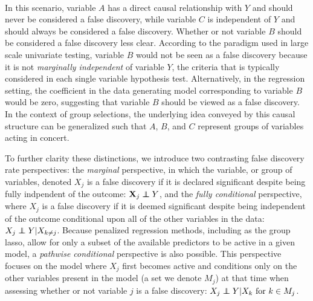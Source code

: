 \begin{center}
 \\
\end{center}

In this scenario, variable $A$ has a direct causal relationship with $Y$ and should never be considered a false discovery, while variable $C$ is independent of $Y$ and should always be considered a false discovery.  Whether or not variable $B$ should be considered a false discovery less clear.  According to the paradigm used in large scale univariate testing, variable $B$ would not be seen as a false discovery because it is not \textit{marginally independent} of variable $Y$, the criteria that is typically considered in each single variable hypothesis test.  Alternatively, in the regression setting, the coefficient in the data generating model corresponding to variable $B$ would be zero, suggesting that variable $B$ should be viewed as a false discovery.  In the context of group selections, the underlying idea conveyed by this causal structure can be generalized such that $A$, $B$, and $C$ represent groups of variables acting in concert.

To further clarity these distinctions, we introduce two contrasting false discovery rate perspectives: the \textit{marginal} perspective, in which the variable, or group of variables, denoted $X_j$ is a false discovery if it is declared significant despite being fully indpendent of the outcome: $\X_j \independent Y$, and the \textit{fully conditional} perspective, where $X_j$ is a false discovery if it is deemed significant despite being independent of the outcome conditional upon all of the other variables in the data: $X_j \independent Y | X_{k \neq j}$.  Because penalized regression methods, including as the group lasso, allow for only a subset of the available predictors to be active in a given model, a \textit{pathwise conditional} perspective is also possible.  This perspective focuses on the model where $X_j$ first becomes active and conditions only on the other variables present in the model (a set we denote $M_j$) at that time when assessing whether or not variable $j$ is a false discovery: $X_j \independent Y | X_k \text{ for } k \in M_j$.

